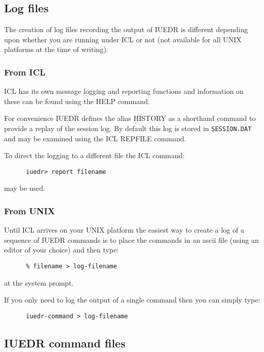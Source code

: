 \subsection{Log files}

The creation of log files recording the output of IUEDR is different 
depending upon whether you are running under ICL or not (not available
for all UNIX platforms at the time of writing).

\subsubsection{From ICL}

ICL has its own message logging and reporting functions and
information on these can be found using the HELP command.
 
For convenience IUEDR defines the alias HISTORY as a shorthand command
to provide a replay of the session log. By default this log is stored
in {\tt SESSION.DAT} and may be examined using the ICL REPFILE
command.

To direct the logging to a different file the ICL command: 
 
\begin{verbatim}
      iuedr> report filename
\end{verbatim}

may be used.

\subsubsection{From UNIX}

Until ICL arrives on your UNIX platform the easiest way to create a
log of a sequence of IUEDR commands is to place the commands in an
ascii file (using an editor of your choice) and then type:

\begin{verbatim}
      % filename > log-filename
\end{verbatim}

at the system prompt.

If you only need to log the output of a single command then you can
simply type:

\begin{verbatim}
      iuedr-command > log-filename
\end{verbatim}

\subsection{IUEDR command files}

